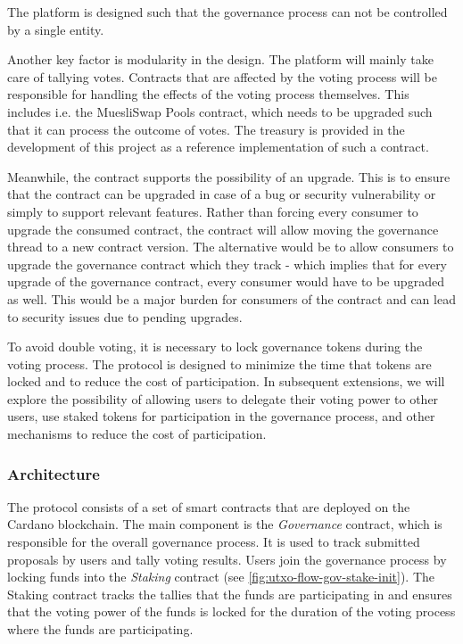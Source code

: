 \documentclass[11pt]{article}
\begin{document}
The platform is designed such that the governance process can not be controlled by a single entity.

Another key factor is modularity in the design.
The platform will mainly take care of tallying votes.
Contracts that are affected by the voting process will be responsible for handling the effects of the voting process themselves.
This includes i.e. the MuesliSwap Pools contract, which needs to be upgraded such that it can process the outcome of votes.
The treasury is provided in the development of this project as a reference implementation of such a contract.

Meanwhile, the contract supports the possibility of an upgrade.
This is to ensure that the contract can be upgraded in case of a bug or security vulnerability or simply to support
relevant features.
Rather than forcing every consumer to upgrade the consumed contract,
the contract will allow moving the governance thread to a new contract version.
The alternative would be to allow consumers to upgrade the governance contract which they track -
which implies that for every upgrade of the governance contract, every consumer would have to be upgraded as well.
This would be a major burden for consumers of the contract and can lead to security issues due to pending upgrades.

To avoid double voting, it is necessary to lock governance tokens during the voting process.
The protocol is designed to minimize the time that tokens are locked and to reduce the cost of participation.
In subsequent extensions, we will explore the possibility of allowing users to delegate their voting power to other users,
use staked tokens for participation in the governance process, and other mechanisms to reduce the cost of participation.

\subsubsection{Architecture}
\label{sec:architecture}

The protocol consists of a set of smart contracts that are deployed on the Cardano blockchain.
The main component is the \emph{Governance} contract, which is responsible for the overall governance process.
It is used to track submitted proposals by users and tally voting results.
Users join the governance process by locking funds into the \emph{Staking} contract (see \cref{fig:utxo-flow-gov-stake-init}).
The Staking contract tracks the tallies that the funds are participating in and ensures that
the voting power of the funds is locked for the duration of the voting process where the funds are participating.
\end{document}
